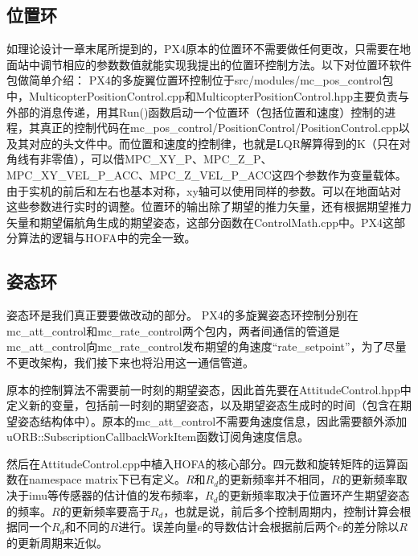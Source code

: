 \subsection*{位置环}
如理论设计一章末尾所提到的，PX4原本的位置环不需要做任何更改，只需要在地面站中调节相应的参数数值就能实现我提出的位置环控制方法。以下对位置环软件包做简单介绍：
PX4的多旋翼位置环控制位于src/modules/mc\_pos\_control包中，MulticopterPositionControl.cpp和MulticopterPositionControl.hpp主要负责与外部的消息传递，用其Run()函数启动一个位置环（包括位置和速度）控制的进程，其真正的控制代码在mc\_pos\_control/PositionControl/PositionControl.cpp以及其对应的头文件中。而位置和速度的控制律，也就是LQR解算得到的K（只在对角线有非零值），可以借MPC\_XY\_P、MPC\_Z\_P、MPC\_XY\_VEL\_P\_ACC、MPC\_Z\_VEL\_P\_ACC这四个参数作为变量载体。由于实机的前后和左右也基本对称，xy轴可以使用同样的参数。可以在地面站对这些参数进行实时的调整。位置环的输出除了期望的推力矢量，还有根据期望推力矢量和期望偏航角生成的期望姿态，这部分函数在ControlMath.cpp中。PX4这部分算法的逻辑与HOFA中的完全一致。






\subsection*{姿态环}
姿态环是我们真正要要做改动的部分。
PX4的多旋翼姿态环控制分别在mc\_att\_control和mc\_rate\_control两个包内，两者间通信的管道是mc\_att\_control向mc\_rate\_control发布期望的角速度“rate\_setpoint”，为了尽量不更改架构，我们接下来也将沿用这一通信管道。

原本的控制算法不需要前一时刻的期望姿态，因此首先要在AttitudeControl.hpp中定义新的变量，包括前一时刻的期望姿态，以及期望姿态生成时的时间（包含在期望姿态结构体中）。原本的mc\_att\_control不需要角速度信息，因此需要额外添加uORB::SubscriptionCallbackWorkItem函数订阅角速度信息。

然后在AttitudeControl.cpp中植入HOFA的核心部分。四元数和旋转矩阵的运算函数在namespace matrix下已有定义。$R$和$R_d$的更新频率并不相同，$R$的更新频率取决于imu等传感器的估计值的发布频率，$R_d$的更新频率取决于位置环产生期望姿态的频率。$R$的更新频率要高于$R_d$，也就是说，前后多个控制周期内，控制计算会根据同一个$R_d$和不同的$R$进行。误差向量$e$的导数估计会根据前后两个$e$的差分除以$R$的更新周期来近似。

